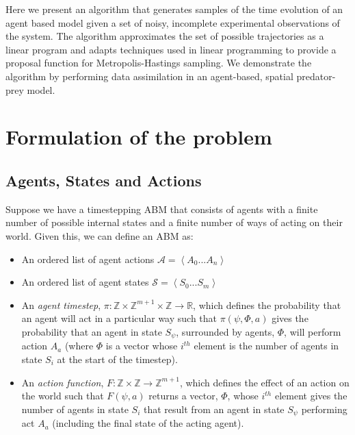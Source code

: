 \documentclass{article}
\begin{document}
Here we present an algorithm that generates samples of the time evolution of an agent based model given a set of noisy, incomplete experimental observations of the system. The algorithm approximates the set of possible trajectories as a linear program and adapts techniques used in linear programming to provide a proposal function for Metropolis-Hastings sampling. We demonstrate the algorithm by performing data assimilation in an agent-based, spatial predator-prey model.


\section{Formulation of the problem}

\subsection{Agents, States and Actions}
\label{abmdef}
Suppose we have a timestepping ABM that consists of agents with a finite number of possible internal states and a finite number of ways of acting on their world. Given this, we can define an ABM as:
\begin{itemize}
	\item An ordered list of agent actions $\mathcal{A} =\left< A_0 ... A_n \right>$
	
	\item An ordered list of agent states $\mathcal{S} = \left<S_0 ... S_m\right>$
	
	\item An \textit{agent timestep}, $\pi : \mathbb{Z}\times\mathbb{Z}^{m+1}\times\mathbb{Z} \to \mathbb{R}$, which defines the probability that an agent will act in a particular way such that $\pi(\psi,\Phi,a)$ gives the probability that an agent in state $S_\psi$, surrounded by agents, $\Phi$, will perform action $A_a$ (where $\Phi$ is a vector whose $i^{th}$ element is the number of agents in state $S_i$ at the start of the timestep).
	
	\item An \textit{action function}, $F: \mathbb{Z} \times \mathbb{Z} \to \mathbb{Z}^{m+1}$, which defines the effect of an action on the world such that $F(\psi, a)$ returns a vector, $\Phi$, whose $i^{th}$ element gives the number of agents in state $S_i$ that result from an agent in state $S_\psi$ performing act $A_a$ (including the final state of the acting agent).
\end{itemize}
\end{document}
